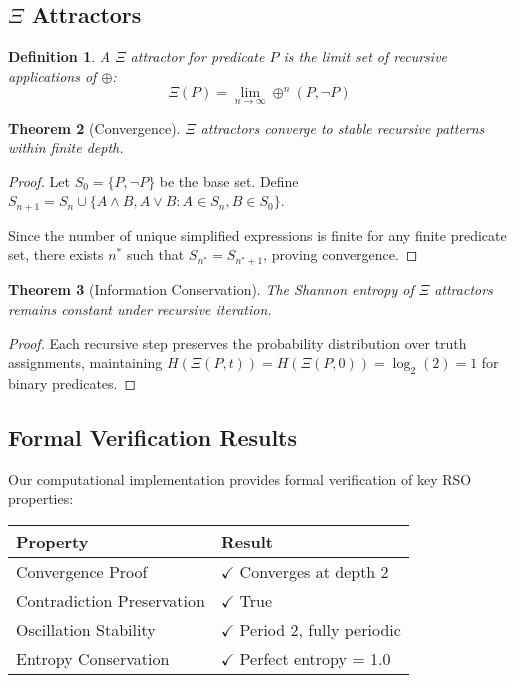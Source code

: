 \documentclass[11pt,a4paper]{article}
\newtheorem{theorem}{Theorem}[section]
\newtheorem{definition}[theorem]{Definition}
\begin{document}
\subsection{$\Xi$ Attractors}

\begin{definition}
A $\Xi$ attractor for predicate $P$ is the limit set of recursive applications of $\oplus$:
\begin{equation}
\Xi(P) = \lim_{n \to \infty} \oplus^n(P, \neg P)
\end{equation}
\end{definition}

\begin{theorem}[Convergence]
$\Xi$ attractors converge to stable recursive patterns within finite depth.
\end{theorem}

\begin{proof}
Let $S_0 = \{P, \neg P\}$ be the base set. Define $S_{n+1} = S_n \cup \{A \land B, A \lor B : A \in S_n, B \in S_0\}$. 

Since the number of unique simplified expressions is finite for any finite predicate set, there exists $n^*$ such that $S_{n^*} = S_{n^*+1}$, proving convergence.
\end{proof}

\begin{theorem}[Information Conservation]
The Shannon entropy of $\Xi$ attractors remains constant under recursive iteration.
\end{theorem}

\begin{proof}
Each recursive step preserves the probability distribution over truth assignments, maintaining $H(\Xi(P, t)) = H(\Xi(P, 0)) = \log_2(2) = 1$ for binary predicates.
\end{proof}

\subsection{Formal Verification Results}

Our computational implementation provides formal verification of key RSO properties:

\begin{center}
\begin{tabular}{ll}
\toprule
\textbf{Property} & \textbf{Result} \\
\midrule
Convergence Proof & $\checkmark$ Converges at depth 2 \\
Contradiction Preservation & $\checkmark$ True \\
Oscillation Stability & $\checkmark$ Period 2, fully periodic \\
Entropy Conservation & $\checkmark$ Perfect entropy = 1.0 \\
\bottomrule
\end{tabular}
\end{center}
\end{document}
